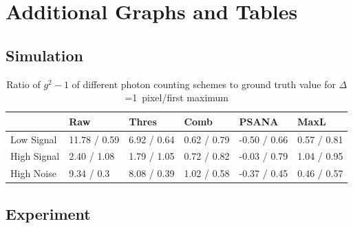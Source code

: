 \chapter{Additional Graphs and Tables}
\section{Simulation}

\begin{table}
	\caption{Ratio of $g^2-1$ of different photon counting schemes to ground truth value  for $\Delta$=1\, pixel/first maximum}
	\label{tab:photonrecon}
	
	\begin{tabular}{llllll}
		\toprule
		{} &           Raw &        Thres &         Comb &         PSANA &         MaxL \\
		\midrule
		Low Signal  &  11.78 / 0.59 &  6.92 / 0.64 &  0.62 / 0.79 &   -0.50 / 0.66 &  0.57 / 0.81 \\
		High Signal &    2.40 / 1.08 &  1.79 / 1.05 &  0.72 / 0.82 &  -0.03 / 0.79 &  1.04 / 0.95 \\
		High Noise  &    9.34 / 0.3 &  8.08 / 0.39 &  1.02 / 0.58 &  -0.37 / 0.45 &  0.46 / 0.57 \\
		\bottomrule
	\end{tabular}
\end{table}

\section{Experiment}

